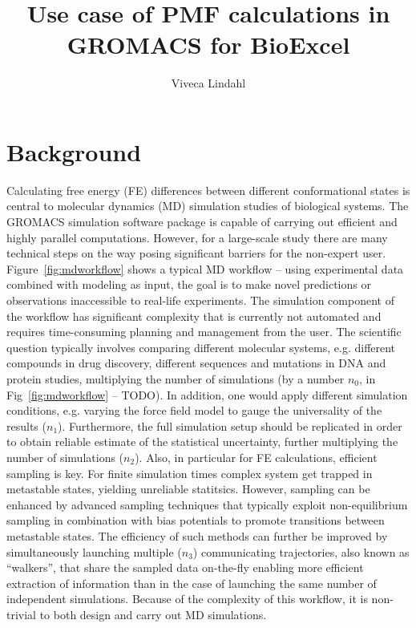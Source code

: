 \documentclass[11pt,a4paper]{article}
\title{Use case of PMF calculations in GROMACS for BioExcel}
\author{Viveca Lindahl}
\begin{document}
\maketitle
\tableofcontents

\section{Background}
Calculating free energy (FE) differences between different conformational states is central to molecular dynamics (MD) simulation studies of biological systems. The GROMACS simulation software package is capable of carrying out efficient and highly parallel computations. However, for a large-scale study there are many technical steps on the way posing significant barriers for the non-expert user. Figure~\ref{fig:mdworkflow} shows a typical MD workflow -- using experimental data combined with modeling as input, the goal is to  make novel predictions or observations inaccessible to real-life experiments. The simulation component of the workflow has significant complexity that is currently not automated and requires time-consuming planning and management from the user. The scientific question typically involves comparing different molecular systems, e.g. different compounds in drug discovery, different sequences and mutations in DNA and protein studies, multiplying the number of simulations (by a number $n_0$, in Fig~\ref{fig:mdworkflow} -- TODO). In addition, one would apply  different simulation conditions, e.g. varying the force field model to gauge the universality of the results ($n_1$). Furthermore, the full simulation setup should be replicated in order to obtain reliable estimate of the statistical uncertainty, further multiplying the number of simulations ($n_2$).  Also, in particular for FE calculations, efficient sampling is key. For finite simulation times complex system get trapped in metastable states, yielding unreliable statitsics. However, sampling can be enhanced by advanced sampling techniques that typically exploit non-equilibrium sampling in combination with bias potentials to promote transitions between metastable states. The efficiency of such methods can further be improved by simultaneously launching multiple ($n_3$) communicating trajectories, also known as ``walkers'', that share the sampled data on-the-fly enabling more efficient extraction of information than in the case of launching the same number of independent simulations. Because of the complexity of this workflow, it is non-trivial to both design and carry out MD simulations. 
\end{document}
